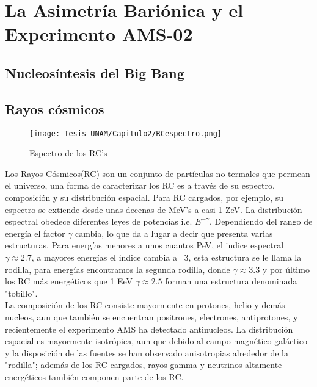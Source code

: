 

\chapter{La Asimetría Bariónica y el Experimento AMS-02}
\section{Nucleosíntesis del Big Bang}


\section{Rayos cósmicos}

\begin{figure}[h!]
    \centering
    \texttt{[image: Tesis-UNAM/Capitulo2/RCespectro.png]}
    \caption{Espectro de los RC's}
    \label{fig:enter-label}
\end{figure}
Los Rayos Cósmicos(RC) son un conjunto de partículas no termales que permean el universo, una forma de caracterizar los RC es a través de su espectro, composición y su distribución espacial. Para RC cargados, por ejemplo, su espectro se extiende desde unas decenas de MeV's a casi 1 ZeV. La distribución espectral obedece diferentes leyes de potencias i.e. $E^{-\gamma}$\cite{Workman:2022ynf}. Dependiendo del rango de energía el factor $\gamma$ cambia, lo que da a lugar a decir que presenta varias estructuras. Para energías menores a unos cuantos PeV, el indice espectral $\gamma \approx 2.7$, a mayores energías el indice cambia a ~3, esta estructura se le llama la rodilla, para energías encontramos la segunda rodilla, donde $\gamma \approx3.3$ y por último los RC más energéticos que 1 EeV $\gamma \approx2.5$ forman una estructura denominada "tobillo"\cite{Workman:2022ynf}.\\

La composición de los RC consiste mayormente en protones, helio y demás nucleos, aun que también se encuentran positrones, electrones, antiprotones, y recientemente el experimento AMS ha detectado antinucleos\cite{Doetinchem_2020}. La distribución espacial es mayormente isotrópica, aun que debido al campo magnético galáctico y la disposición de las fuentes se han observado anisotropias alrededor de la "rodilla"\cite{Workman:2022ynf}; además de los RC cargados, rayos gamma y neutrinos altamente energéticos también componen parte de los RC.\\

